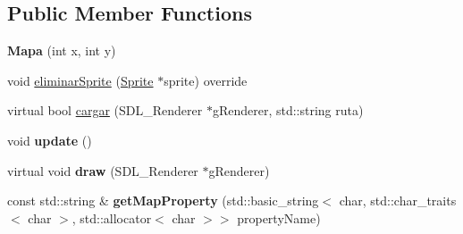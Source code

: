 \subsection*{Public Member Functions}
\begin{DoxyCompactItemize}
\item 
{\bfseries Mapa} (int x, int y)\hypertarget{class_mapa_a2a88268f7c620deb8d2561e18a57f0c3}{}\label{class_mapa_a2a88268f7c620deb8d2561e18a57f0c3}

\item 
void \hyperlink{class_mapa_a142d3bbb3a2166aa575b90e50c790a36}{eliminar\+Sprite} (\hyperlink{class_sprite}{Sprite} $\ast$sprite) override
\item 
virtual bool \hyperlink{class_mapa_a25d45fc6b9c1622f8261a0c849a78294}{cargar} (S\+D\+L\+\_\+\+Renderer $\ast$g\+Renderer, std\+::string ruta)
\item 
void {\bfseries update} ()\hypertarget{class_mapa_a5e592dd55f2fd9cf82aa453237260bce}{}\label{class_mapa_a5e592dd55f2fd9cf82aa453237260bce}

\item 
virtual void {\bfseries draw} (S\+D\+L\+\_\+\+Renderer $\ast$g\+Renderer)\hypertarget{class_mapa_a978c5caf727e7f7ee739cd7eb9a690ce}{}\label{class_mapa_a978c5caf727e7f7ee739cd7eb9a690ce}

\item 
const std\+::string \& {\bfseries get\+Map\+Property} (std\+::basic\+\_\+string$<$ char, std\+::char\+\_\+traits$<$ char $>$, std\+::allocator$<$ char $>$$>$ property\+Name)\hypertarget{class_mapa_a169f2cb4198d7933d88099fb16042b9f}{}\label{class_mapa_a169f2cb4198d7933d88099fb16042b9f}

\end{DoxyCompactItemize}
